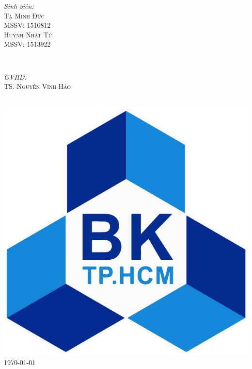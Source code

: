 \documentclass[a4paper, 12pt]{article}
\begin{document}
\begin{titlepage}
		\begin{minipage}{0.4\textwidth}
			\begin{flushleft} \large
				\emph{Sinh viên:}\\
				\textsc{Tạ Minh Đức} \\%
				\textsc{MSSV: 1510812}\\
				\textsc{Huỳnh Nhật Tú} \\%
				\textsc{MSSV:  1513922}
				
			\end{flushleft}
		\end{minipage}
		~
		\begin{minipage}{0.4\textwidth}
			\begin{flushright} \large
				\emph{GVHD:} \\
				\textsc{TS. Nguyễn Vĩnh Hảo} %
			\end{flushright}
		\end{minipage}\\[1cm]
		
		
		\includegraphics[scale=0.25]{images/LogoBK.jpg}\\[1cm] %
		
		{\large \today}\\[0cm] %
		
		\vfill %
	\end{titlepage}
	
\end{document}
